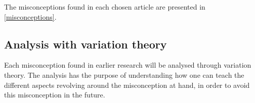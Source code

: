 The misconceptions found in each chosen article are presented in 
\cref{misconceptions}. 


\subsection{Analysis with variation theory}

Each misconception found in earlier research will be analysed through 
variation theory. The analysis has the purpose of understanding how one can 
teach the different aspects revolving around the misconception at hand, in 
order to avoid this misconception in the future. 